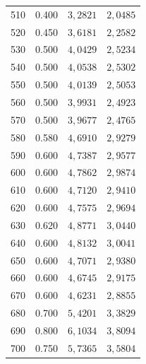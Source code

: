 \begin{table}[H]
\begin{tabular}{S[table-format=3.0] S[table-format=1.3] S  S}
      510            &         0.400        &       {$3,2821$}        &       {$2,0485$}       \\
      520            &         0.450        &       {$3,6181$}        &       {$2,2582$}       \\
      530            &         0.500        &       {$4,0429$}        &       {$2,5234$}       \\
      540            &         0.500        &       {$4,0538$}        &       {$2,5302$}       \\
      550            &         0.500        &       {$4,0139$}        &       {$2,5053$}       \\
      560            &         0.500        &       {$3,9931$}        &       {$2,4923$}       \\
      570            &         0.500        &       {$3,9677$}        &       {$2,4765$}       \\
      580            &         0.580        &       {$4,6910$}        &       {$2,9279$}       \\
      590            &         0.600        &       {$4,7387$}        &       {$2,9577$}       \\
      600            &         0.600        &       {$4,7862$}        &       {$2,9874$}       \\
      610            &         0.600        &       {$4,7120$}        &       {$2,9410$}       \\
      620            &         0.600        &       {$4,7575$}        &       {$2,9694$}       \\
      630            &         0.620        &       {$4,8771$}        &       {$3,0440$}       \\
      640            &         0.600        &       {$4,8132$}        &       {$3,0041$}       \\
      650            &         0.600        &       {$4,7071$}        &       {$2,9380$}       \\
      660            &         0.600        &       {$4,6745$}        &       {$2,9175$}       \\
      670            &         0.600        &       {$4,6231$}        &       {$2,8855$}       \\
      680            &         0.700        &       {$5,4201$}        &       {$3,3829$}       \\
      690            &         0.800        &       {$6,1034$}        &       {$3,8094$}       \\
      700            &         0.750        &       {$5,7365$}        &       {$3,5804$}       \\ 
    \bottomrule
    \end{tabular}
\end{table}
